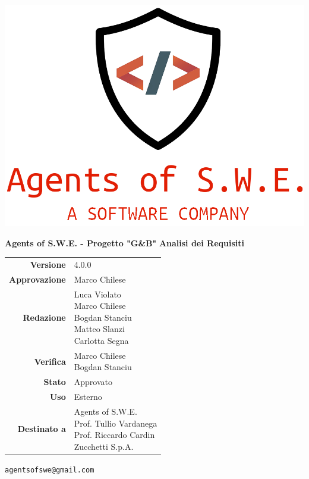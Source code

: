 


\begin{titlepage}
\thispagestyle{empty}

\begin{center}

\includegraphics[scale=0.3]{./images/logo.png} 

\large \textbf{Agents of S.W.E. - Progetto "G\&B"}
\vfill
\Huge \textbf{Analisi dei Requisiti}
\vfill
\large
\renewcommand{\arraystretch}{1.3}
\begin{tabular}{r|l}
\textbf{Versione} & 4.0.0\\
\textbf{Approvazione} & Marco Chilese\\
\textbf{Redazione} & \parbox[t]{5cm}{Luca Violato\\Marco Chilese\\Bogdan Stanciu\\Matteo Slanzi\\ Carlotta Segna}\\
\textbf{Verifica} & \parbox[t]{5cm}{Marco Chilese\\Bogdan Stanciu}\\
\textbf{Stato} & Approvato\\
\textbf{Uso} & Esterno\\
\textbf{Destinato a} & \parbox[t]{5cm}{Agents of S.W.E. \\Prof. Tullio Vardanega\\Prof. Riccardo Cardin \\ Zucchetti S.p.A.}
\end{tabular}
\vfill
\small
\texttt{agentsofswe@gmail.com}
\end{center}
\end{titlepage}

